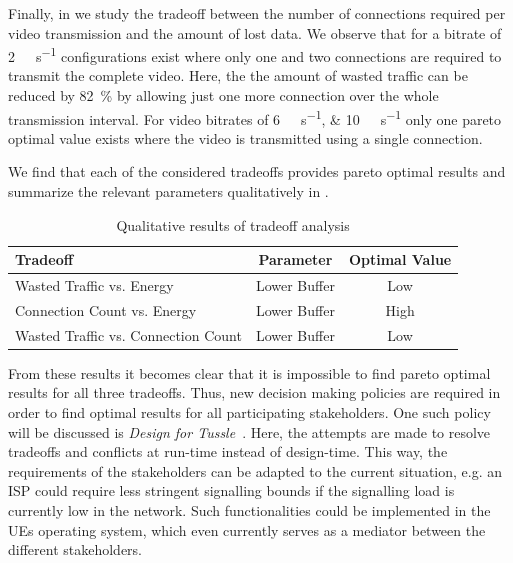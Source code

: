 Finally, in  we study the tradeoff between the number of connections required per video transmission and the amount of lost data.
We observe that for a bitrate of \SI{2}{\mega\bit\per\second} configurations exist where only one and two connections are required to transmit the complete video.
Here, the the amount of wasted traffic can be reduced by \SI{82}{\percent} by allowing just one more connection over the whole transmission interval.
For video bitrates of \SIlist{6;10}{\mega\bit\per\second} only one pareto optimal value exists where the video is transmitted using a single connection.

We find that each of the considered tradeoffs provides pareto optimal results and summarize the relevant parameters qualitatively in .
\begin{table}
  \centering
  \begin{tabular}{lcc}
    \toprule
    Tradeoff & Parameter & Optimal Value\\
    \midrule
    Wasted Traffic vs. Energy & Lower Buffer & Low\\
    Connection Count vs. Energy & Lower Buffer & High\\
    Wasted Traffic vs. Connection Count & Lower Buffer & Low\\
    \bottomrule
  \end{tabular}
  \caption{Qualitative results of tradeoff analysis}
  \label{tab:application:lte_video:numerical_evaluation:trade_offs:summary}
\end{table}

From these results it becomes clear that it is impossible to find pareto optimal results for all three tradeoffs.
Thus, new decision making policies are required in order to find optimal results for all participating stakeholders.
One such policy will be discussed is \emph{Design for Tussle}~\cite{trilogy2008,Clark2005}.
Here, the attempts are made to resolve tradeoffs and conflicts at run-time instead of design-time.
This way, the requirements of the stakeholders can be adapted to the current situation, e.g. an \gls{ISP} could require less stringent signalling bounds if the signalling load is currently low in the network.
Such functionalities could be implemented in the \glspl{UE} operating system, which even currently serves as a mediator between the different stakeholders.